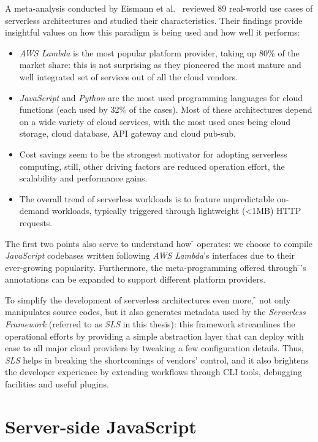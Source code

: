 A meta-analysis conducted by Eismann et al.~\cite{meta-analysis} reviewed
89 real-world use cases of serverless architectures and studied their characteristics.
Their findings provide insightful values on how this
paradigm is being used and how well it performs:
\begin{itemize}
  \item \textit{AWS Lambda} is the most popular platform provider, taking up 80\% of the market share:
    this is not surprising as they pioneered the most mature and well integrated set of services out of all
    the cloud vendors.
  \item \textit{JavaScript} and \textit{Python} are the most used
    programming languages for cloud functions (each used by 32\% of the cases).
    Most of these architectures depend on a wide variety of cloud services, with the most used
    ones being cloud storage, cloud database, API gateway and cloud pub-sub.
  \item Cost savings seem to be the strongest motivator for adopting serverless computing,
    still, other driving factors are reduced operation effort, the scalability and performance gains.
  \item The overall trend of serverless workloads is to feature unpredictable on-demand
  workloads, typically triggered through lightweight (<1MB) HTTP requests.
\end{itemize}

The first two points also serve to understand how \f{} operates:
we choose to compile \textit{JavaScript} codebases written following
\textit{AWS Lambda}'s interfaces due to their ever-growing popularity.
Furthermore, the meta-programming offered through \f{}'s annotations
can be expanded to support different platform providers.

To simplify the development of serverless architectures even more,
\f{} not only manipulates source codes, but it also generates metadata used
by the \textit{Serverless Framework} \cite{sls} (referred to as \textit{SLS} in this thesis):
this framework streamlines the operational efforts by providing a simple abstraction layer
that can deploy with ease to all major cloud providers by tweaking a few configuration details.
Thus, \textit{SLS} helps in breaking the shortcomings of vendors' control, and it also brightens
the developer experience by extending workflows through CLI tools, debugging facilities and useful plugins.

\section{Server-side JavaScript}

